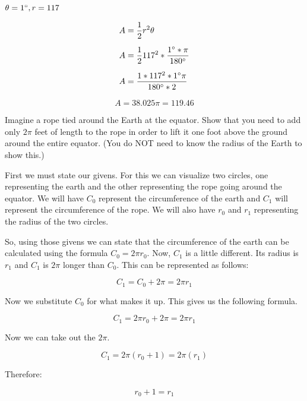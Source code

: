 \documentclass[10pt,letterpaper]{amspset}
\begin{document}
\begin{problem}[62.]
$\theta = 1\degree, r = 117$
\end{problem}

\begin{solution}[Solution]

\begin{align}
    A &= \frac{1}{2} r^2  \theta \\[+2mm]
    A &= \frac{1}{2} 117^2 * \frac{1\degree * \pi}{180\degree} \\[+2mm]
    A &= \frac{1 * 117^2 * 1\degree \pi}{180\degree * 2} \\[+2mm]
\end{align}
\[\boxed{A = 38.025 \pi = 119.46}\]
\end{solution}


\begin{problem}[63.]
Imagine a rope tied around the Earth at the equator. Show that you need to add only $2\pi$ feet of length to the rope in order to lift it one foot above the ground around the entire equator.
(You do NOT need to know the radius of the Earth to show this.)
\end{problem}

\begin{solution}[Solution]
First we must state our givens. For this we can visualize two circles, one representing the earth and the other representing the rope going around the equator. We will have $C_0$ represent the circumference of the earth and $C_1$ will represent the circumference of the rope. We will also have $r_0$ and $r_1$ representing the radius of the two circles.  

So, using those givens we can state that the circumference of the earth can be calculated using the formula $C_0 = 2 \pi r_0$. Now, $C_1$ is a little different. Its radius is $r_1$ and $C_1$ is $2\pi$ longer than $C_0$. This can be represented as follows:

\[C_1 = C_0 + 2\pi = 2 \pi r_1\]

Now we substitute $C_0$ for what makes it up. This gives us the following formula.

\[C_1 = 2\pi r_0 + 2\pi = 2\pi r_1\]

Now we can take out the $2 \pi$.

\[C_1 = 2 \pi ( r_0 + 1 ) = 2 \pi (r_1)\]

Therefore:

\[\boxed{r_0 + 1 = r_1} \]

\end{solution}
\end{document}
